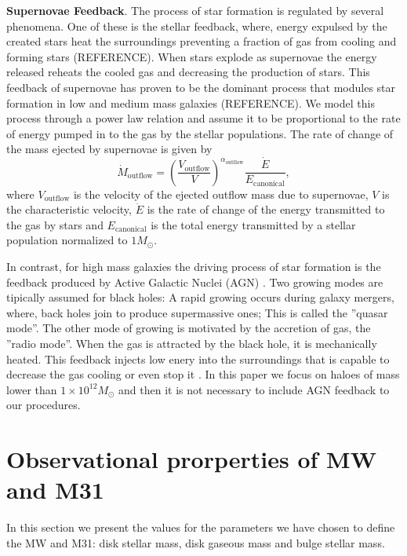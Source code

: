 \documentclass[usenatbib]{mn2e}
\begin{document}
\textbf{Supernovae Feedback}. 
The process of star formation is regulated by several phenomena. One of these is the stellar feedback, where, energy expulsed by the created stars heat the surroundings preventing a 
fraction of gas from cooling and forming stars (REFERENCE). When stars explode as supernovae the energy released reheats the cooled gas and decreasing the production of stars. 
This feedback of supernovae has proven to be  the dominant process that modules star formation in low and medium mass galaxies (REFERENCE). 
We model this process through a power law relation and  assume it to be  proportional to the rate of energy pumped in to the
 gas by the stellar populations. The rate of change of the mass ejected  by supernovae is given by
\begin{equation}
 \dot{M}_{\text{outflow}}=\left( \frac{V_{\text{outflow}}}{V} \right)^{\alpha_{\text{outflow}}}\frac{\dot{E}}{E_{\text{canonical}}}, \label{eq:supernovae}
\end{equation}
where  $V_{\text{outflow}}$ is the velocity of the ejected outflow mass due to supernovae, $V$ is the characteristic velocity,  $\dot{E}$ is the rate of change of 
the energy transmitted to the gas by stars and $E_{\text{canonical}}$ is the total energy transmitted by a stellar population normalized to $1M_{\odot}$.


In contrast, for high mass galaxies the driving process of star formation is the feedback produced by Active 
Galactic Nuclei (AGN) \citep{2006MNRAS.365...11C}. Two growing modes are tipically assumed for black holes: A rapid growing occurs during galaxy mergers, where, back holes join to produce supermassive 
ones; This is called the   ''quasar mode''. The other mode of growing is motivated by the accretion of gas, the ''radio mode''. When the gas is attracted by the black hole, it is mechanically heated. This
feedback injects low enery into the surroundings that is capable to decrease the gas cooling or even stop it \citep{2006MNRAS.365...11C}.
In this paper we focus on haloes of mass lower than $1\times 10^{12}M_{\odot}$ and then it is not necessary to include AGN feedback to our procedures.


\section{Observational prorperties of MW and M31}  
\label{sec:discussion}  

In this section we present the values for the parameters we have chosen to define the MW and M31: disk stellar mass, disk gaseous mass and bulge stellar mass.
\end{document}
